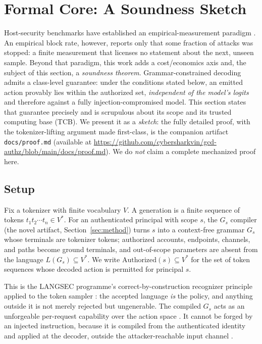 \makeatletter
{}
\makeatother

\section{Formal Core: A Soundness Sketch}
\label{sec:formal}

Host-security benchmarks have established an empirical-measurement paradigm \cite{sassaman2013langsec,zhang2024asb}. An empirical block rate, however, reports only that some fraction of attacks was stopped: a finite measurement that licenses no statement about the next, unseen sample. Beyond that paradigm, this work adds a cost/economics axis and, the subject of this section, a \emph{soundness theorem}. Grammar-constrained decoding admits a class-level guarantee: under the conditions stated below, an emitted action provably lies within the authorized set, \emph{independent of the model's logits} and therefore against a fully injection-compromised model. This section states that guarantee precisely and is scrupulous about its scope and its trusted computing base (TCB). We present it as a \emph{sketch}: the fully detailed proof, with the tokenizer-lifting argument made first-class, is the companion artifact \texttt{docs/proof.md} (available at \url{https://github.com/cybersharkvin/gcd-authz/blob/main/docs/proof.md}). We do \emph{not} claim a complete mechanized proof here.

\subsection{Setup}
\label{sub:formal-setup}

Fix a tokenizer with finite vocabulary \(V\). A generation is a finite sequence of tokens \(t_1 t_2 \cdots t_n \in V^{*}\). For an authenticated principal with scope \(s\), the \(G_s\) compiler (the novel artifact, Section~\ref{sec:method}) turns \(s\) into a context-free grammar \(G_s\) whose terminals are tokenizer tokens; authorized accounts, endpoints, channels, and paths become ground terminals, and out-of-scope parameters are absent from the language \(L(G_s) \subseteq V^{*}\). We write \(\mathrm{Authorized}(s) \subseteq V^{*}\) for the set of token sequences whose decoded action is permitted for principal \(s\).

This is the LANGSEC programme's correct-by-construction recognizer principle applied to the token sampler \cite{sassaman2013langsec}: the accepted language \emph{is} the policy, and anything outside it is not merely rejected but ungenerable. The compiled \(G_s\) acts as an unforgeable per-request capability over the action space \cite{dennisvanhorn1966,miller2006}. It cannot be forged by an injected instruction, because it is compiled from the authenticated identity and applied at the decoder, outside the attacker-reachable input channel \cite{dennisvanhorn1966,miller2006}.

